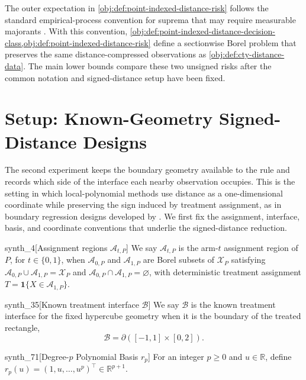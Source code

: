 \documentclass[11pt]{article}
\begin{document}
The outer expectation in \cref{obj:def:point-indexed-distance-risk} follows the standard empirical-process convention for suprema that may require measurable majorants \citep{VanderVaart1996}. With this convention, \cref{obj:def:point-indexed-distance-decision-class,obj:def:point-indexed-distance-risk} define a sectionwise Borel problem that preserves the same distance-compressed observations as \cref{obj:def:cty-distance-data}. The main lower bounds compare these two unsigned risks after the common notation and signed-distance setup have been fixed.


\section{Setup: Known-Geometry Signed-Distance Designs}
\label{sec:signed-setup}

The second experiment keeps the boundary geometry available to the rule and records which side of the interface each nearby observation occupies. This is the setting in which local-polynomial methods use distance as a one-dimensional coordinate while preserving the sign induced by treatment assignment, as in boundary regression designs developed by \citet{CattaneoTitiunikYu2026Distance}. We first fix the assignment, interface, basis, and coordinate conventions that underlie the signed-distance reduction.

\begin{definitionv}{synth_4}[Assignment regions $\mathcal A_{t,P}$]
We say $\mathcal A_{t,P}$ is the arm-$t$ assignment region of $P$, for $t\in\{0,1\}$, when $\mathcal A_{0,P}$ and $\mathcal A_{1,P}$ are Borel subsets of $\mathcal X_P$ satisfying $\mathcal A_{0,P}\cup\mathcal A_{1,P}=\mathcal X_P$ and $\mathcal A_{0,P}\cap\mathcal A_{1,P}=\varnothing$, with deterministic treatment assignment $T=\mathbf 1\{X\in\mathcal A_{1,P}\}$.
\end{definitionv}

\begin{definitionv}{synth_35}[Known treatment interface \(\mathcal B\)]
We say \(\mathcal B\) is the known treatment interface for the fixed hypercube geometry when it is the boundary of the treated rectangle,\[\mathcal B=\partial([-1,1]\times[0,2]).\]
\end{definitionv}

\begin{definitionv}{synth_71}[Degree-$p$ Polynomial Basis $r_p$]
For an integer $p\geq0$ and $u\in\mathbb R$, define $r_p(u)=(1,u,\ldots,u^p)^\top\in\mathbb R^{p+1}$.
\end{definitionv}
\end{document}
